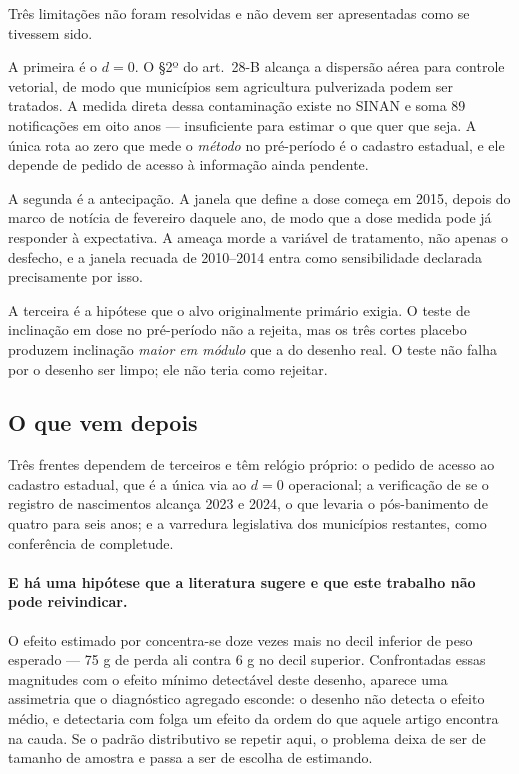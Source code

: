 Três limitações não foram resolvidas e não devem ser apresentadas como se
tivessem sido.

A primeira é o \(d = 0\). O §2º do art.~28-B alcança a dispersão aérea para
controle vetorial, de modo que municípios sem agricultura pulverizada podem ser
tratados. A medida direta dessa contaminação existe no SINAN e soma 89
notificações em oito anos --- insuficiente para estimar o que quer que seja. A
única rota ao zero que mede o \emph{método} no pré-período é o cadastro estadual,
e ele depende de pedido de acesso à informação ainda pendente.

A segunda é a antecipação. A janela que define a dose começa em 2015, depois do
marco de notícia de fevereiro daquele ano, de modo que a dose medida pode já
responder à expectativa. A ameaça morde a variável de tratamento, não apenas o
desfecho, e a janela recuada de 2010--2014 entra como sensibilidade declarada
precisamente por isso.

A terceira é a hipótese que o alvo originalmente primário exigia. O teste de
inclinação em dose no pré-período não a rejeita, mas os três cortes placebo
produzem inclinação \emph{maior em módulo} que a do desenho real. O teste não
falha por o desenho ser limpo; ele não teria como rejeitar.

\subsection{O que vem depois}
\label{sub:depois}

Três frentes dependem de terceiros e têm relógio próprio: o pedido de acesso ao
cadastro estadual, que é a única via ao \(d = 0\) operacional; a verificação de
se o registro de nascimentos alcança 2023 e 2024, o que levaria o pós-banimento
de quatro para seis anos; e a varredura legislativa dos municípios restantes,
como conferência de completude.

\paragraph{E há uma hipótese que a literatura sugere e que este trabalho não
pode reivindicar.}
O efeito estimado por \citet{reynier2025glyphosate} concentra-se doze vezes mais
no decil inferior de peso esperado --- 75 g de perda ali contra 6 g no decil
superior. Confrontadas essas magnitudes com o efeito mínimo detectável deste
desenho, aparece uma assimetria que o diagnóstico agregado esconde: o desenho
não detecta o efeito médio, e detectaria com folga um efeito da ordem do que
aquele artigo encontra na cauda. Se o padrão distributivo se repetir aqui, o
problema deixa de ser de tamanho de amostra e passa a ser de escolha de
estimando.

